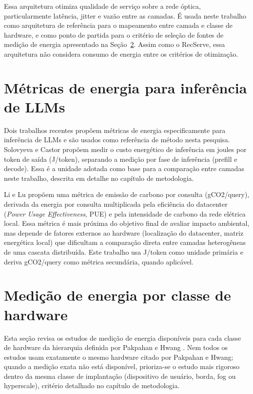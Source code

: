 \documentclass[cic,dipl]{infufrgs}
\begin{document}
Essa arquitetura otimiza qualidade de servi\c{c}o sobre a rede \'optica,
particularmente lat\^encia, jitter e vaz\~ao entre as camadas. \'E usada
neste trabalho como arquitetura de refer\^encia para o mapeamento entre
camada e classe de hardware, e como ponto de partida para o crit\'erio de
sele\c{c}\~ao de fontes de medi\c{c}\~ao de energia apresentado na
Se\c{c}\~ao~\ref{sec:medicoes}. Assim como o RecServe, essa arquitetura
n\~ao considera consumo de energia entre os crit\'erios de otimiza\c{c}\~ao.

\section{M\'etricas de energia para infer\^encia de LLMs}
\label{sec:metricas}

Dois trabalhos recentes propõem m\'etricas de energia especificamente
para infer\^encia de LLMs e s\~ao usados como refer\^encia de m\'etodo
nesta pesquisa. Solovyeva e Castor \cite{solovyeva2026green} prop\~oem
medir o custo energ\'etico de infer\^encia em joules por token de sa\'ida
(J/token), separando a medi\c{c}\~ao por fase de infer\^encia (prefill e
decode). Essa \'e a unidade adotada como base para a compara\c{c}\~ao
entre camadas neste trabalho, descrita em detalhe no cap\'itulo de
metodologia.

Li e Lu \cite{li2026ecothink} prop\~oem uma m\'etrica de emiss\~ao de
carbono por consulta (gCO2/query), derivada da energia por consulta
multiplicada pela efici\^encia do datacenter (\emph{Power Usage
Effectiveness}, PUE) e pela intensidade de carbono da rede el\'etrica
local. Essa m\'etrica \'e mais pr\'oxima do objetivo final de avaliar
impacto ambiental, mas depende de fatores externos ao hardware
(localiza\c{c}\~ao do datacenter, matriz energ\'etica local) que
dificultam a compara\c{c}\~ao direta entre camadas heterog\^eneas de uma
cascata distribu\'ida. Este trabalho usa J/token como unidade prim\'aria
e deriva gCO2/query como m\'etrica secund\'aria, quando aplic\'avel.

\section{Medi\c{c}\~ao de energia por classe de hardware}
\label{sec:medicoes}

Esta se\c{c}\~ao revisa os estudos de medi\c{c}\~ao de energia
dispon\'iveis para cada classe de hardware da hierarquia definida por
Pakpahan e Hwang \cite{pakpahan2026continuum}. Nem todos os estudos usam
exatamente o mesmo hardware citado por Pakpahan e Hwang; quando a
medi\c{c}\~ao exata n\~ao est\'a dispon\'ivel, prioriza-se o estudo mais
rigoroso dentro da mesma classe de implanta\c{c}\~ao (dispositivo de
usu\'ario, borda, fog ou hyperscale), crit\'erio detalhado no cap\'itulo
de metodologia.
\end{document}
